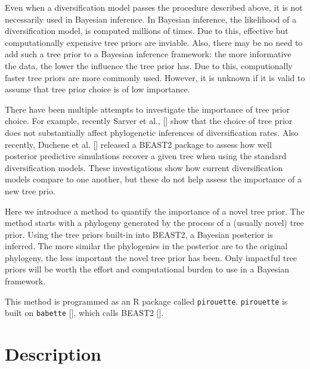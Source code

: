 \documentclass{article}
\begin{document}
Even when a diversification model passes the procedure described above,
it is not necessarily used in Bayesian inference.
In Bayesian inference, the likelihood of a diversification 
model, is computed millions of times.
Due to this, effective but computationally expensive tree priors are inviable.
Also, there may be no need to add such a tree prior to a Bayesian
inference framework: the more informative the data, 
the lower the influence the tree prior has.
Due to this, computionally faster tree priors are more commonly used.
However, it is unknown if it is valid to assume that tree prior choice is 
of low importance.

There have been multiple attempts to investigate the importance of tree
prior choice. For example, recently Sarver et al., [\cite{sarver2019choice}] 
show that the choice of tree prior does not 
substantially affect phylogenetic inferences of diversification rates.
Also recently, Duchene et al. [\cite{duchene2018phylodynamic}] released
a BEAST2 package to assess how well posterior predictive simulations
recover a given tree when using the standard diversification models.
These investigations show how current diversification models compare
to one another, but these do not help assess the importance of a 
new tree prio. 

Here we introduce a method to quantify the importance of a novel tree prior.
The method starts with a phylogeny generated by the process of 
a (usually novel) tree prior.
Using the tree priors built-in into BEAST2, 
a Bayesian posterior is inferred.
The more similar the phylogenies in the posterior are to the original phylogeny,
the less important the novel tree prior has been.
Only impactful tree priors will be worth the effort and computational burden 
to use in a Bayesian framework.

This method is programmed as an R package called \verb;pirouette;.
\verb;pirouette; is built on \verb;babette; [\cite{bilderbeek2018babette}], 
which calls BEAST2 [\cite{bouckaert2014beast}]. 

\section{Description}
\end{document}
